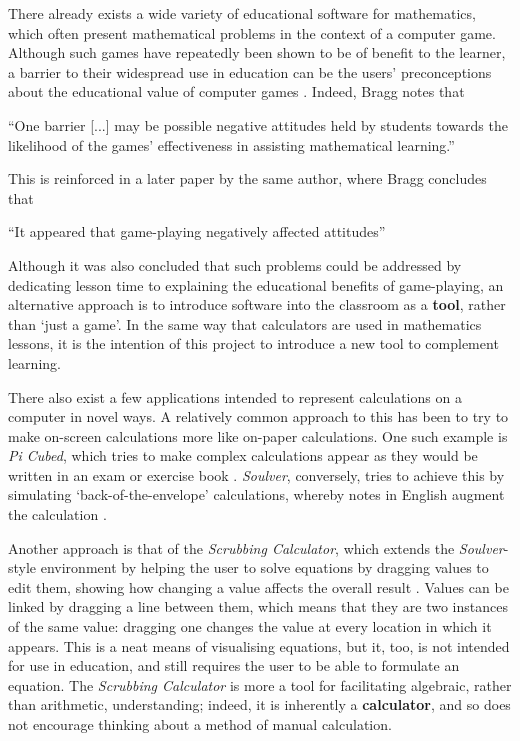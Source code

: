 \documentclass[12pt,twoside,notitlepage,xetex]{report}
\begin{document}
There already exists a wide variety of educational software for mathematics, which often present mathematical problems in the context of a computer game.  Although such games have repeatedly been shown to be of benefit to the learner, a barrier to their widespread use in education can be the users' preconceptions about the educational value of computer games \cite{Swan2009} \cite{Delacruz2010}.  Indeed, Bragg notes that
\begin{center}
\parbox[c]{\textwidth-2cm}{
\small
``One barrier [...] may be possible negative attitudes held by students towards the likelihood of the games' effectiveness in assisting mathematical learning.'' \cite{Bragg2006}
}
\end{center}
This is reinforced in a later paper by the same author, where Bragg concludes that
\begin{center}
\parbox[c]{\textwidth-2cm}{
\small
``It appeared that game-playing negatively affected attitudes'' \cite{Bragg2007}
}
\end{center}
Although it was also concluded that such problems could be addressed by dedicating lesson time to explaining the educational benefits of game-playing, an alternative approach is to introduce software into the classroom as a {\bf tool}, rather than `just a game'.  In the same way that calculators are used in mathematics lessons, it is the intention of this project to introduce a new tool to complement learning.

There also exist a few applications intended to represent calculations on a computer in novel ways.  A relatively common approach to this has been to try to make on-screen calculations more like on-paper calculations.  One such example is \emph{Pi Cubed}, which tries to make complex calculations appear as they would be written in an exam or exercise book \cite{PiCubed}.  \emph{Soulver}, conversely, tries to achieve this by simulating `back-of-the-envelope' calculations, whereby notes in English augment the calculation \cite{Soulver}.

Another approach is that of the \emph{Scrubbing Calculator}, which extends the \emph{Soulver}-style environment by helping the user to solve equations by dragging values to edit them, showing how changing a value affects the overall result \cite{ScrubCalc}.  Values can be linked by dragging a line between them, which means that they are two instances of the same value: dragging one changes the value at every location in which it appears.  This is a neat means of visualising equations, but it, too, is not intended for use in education, and still requires the user to be able to formulate an equation.  The \emph{Scrubbing Calculator} is more a tool for facilitating algebraic, rather than arithmetic, understanding; indeed, it is inherently a {\bf calculator}, and so does not encourage thinking about a method of manual calculation.
\end{document}
